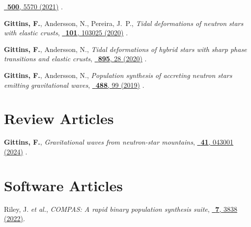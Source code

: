 \begin{etaremune}[start=\value{pubCounter}]
  \href{https://doi.org/10.1093/mnras/staa3635}%
  {\mnras\ \textbf{500}, 5570 (2021)}
  .
\item
  \textbf{Gittins, F.}, Andersson, N., Pereira, J.~P.,
  \textit{Tidal deformations of neutron stars with elastic crusts},
  \href{https://doi.org/10.1103/PhysRevD.101.103025}%
  {\prd\ \textbf{101}, 103025 (2020)}
  .
\item
  \textbf{Gittins, F.}, Andersson, N.,
  \textit{Tidal deformations of hybrid stars with sharp phase transitions and
  elastic crusts},
  \href{https://doi.org/10.3847/1538-4357/ab8aca}%
  {\apj\ \textbf{895}, 28 (2020)}
  .
\item
  \textbf{Gittins, F.}, Andersson, N.,
  \textit{Population synthesis of accreting neutron stars emitting
  gravitational waves},
  \href{https://doi.org/10.1093/mnras/stz1719}%
  {\mnras\ \textbf{488}, 99 (2019)}
  .
%
  \setcounter{pubCounter}{\value{enumi}}
\end{etaremune}

\section{Review Articles}
\secstartswithlist{}%
\addtocounter{pubCounter}{-1}%
\begin{etaremune}[start=\value{pubCounter}]
\item
  \textbf{Gittins, F.},
  \textit{Gravitational waves from neutron-star mountains},
  \href{https://doi.org/10.1088/1361-6382/ad1c35}%
  {\cqg\ \textbf{41}, 043001 (2024)}
  .
%
  \setcounter{pubCounter}{\value{enumi}}
\end{etaremune}

\section{Software Articles}
\secstartswithlist{}%
\addtocounter{pubCounter}{-1}%
\begin{etaremune}[start=\value{pubCounter}]
\item
  Riley, J. \textit{et al.},
  \textit{COMPAS: A rapid binary population synthesis suite},
  \href{https://doi.org/10.21105/joss.03838}%
  {\joss\ \textbf{7}, 3838 (2022)}.
%
  \setcounter{pubCounter}{\value{enumi}}
\end{etaremune}

